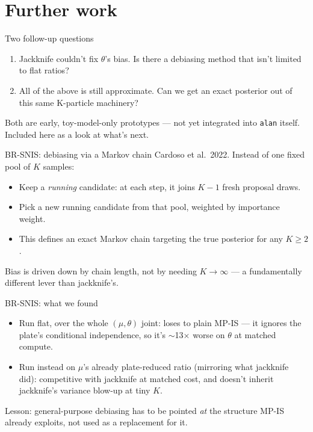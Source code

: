 \documentclass[aspectratio=169]{beamer}
\begin{document}
\section{Further work}

\begin{frame}{Two follow-up questions}
  \begin{enumerate}
    \item Jackknife couldn't fix $\theta$'s bias. \alert{Is there a
      debiasing method that isn't limited to flat ratios?}
    \item All of the above is still approximate. \alert{Can we get an exact
      posterior out of this same K-particle machinery?}
  \end{enumerate}
  \vfill
  Both are early, toy-model-only prototypes --- not yet integrated into
  \texttt{alan} itself. Included here as a look at what's next.
\end{frame}

\begin{frame}{BR-SNIS: debiasing via a Markov chain}
  Cardoso et al.\ 2022. Instead of one fixed pool of $K$ samples:
  \begin{itemize}
    \item Keep a \emph{running} candidate: at each step, it joins $K{-}1$
      fresh proposal draws.
    \item Pick a new running candidate from that pool, weighted by
      importance weight.
    \item This defines an exact Markov chain targeting the true posterior
      for any $K \ge 2$.
  \end{itemize}
  Bias is driven down by \alert{chain length}, not by needing $K \to
  \infty$ --- a fundamentally different lever than jackknife's.
\end{frame}

\begin{frame}{BR-SNIS: what we found}
  \begin{itemize}
    \item Run flat, over the whole $(\mu,\theta)$ joint: \alert{loses to
      plain MP-IS} --- it ignores the plate's conditional independence, so
      it's $\sim$13$\times$ worse on $\theta$ at matched compute.
    \item Run instead on $\mu$'s already plate-reduced ratio (mirroring what
      jackknife did): competitive with jackknife at matched cost, and
      \alert{doesn't inherit jackknife's variance blow-up at tiny $K$.}
  \end{itemize}
  \vfill
  \small Lesson: general-purpose debiasing has to be pointed \emph{at} the
  structure MP-IS already exploits, not used as a replacement for it.
\end{frame}
\end{document}
